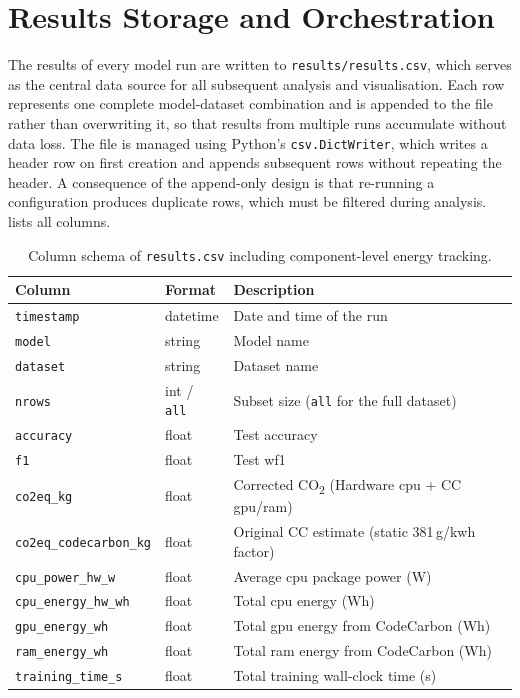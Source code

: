\section{Results Storage and Orchestration}
\label{implementation_results}

The results of every model run are written to \texttt{results/results.csv}, which serves as the central data source for all subsequent analysis and visualisation. Each row represents one complete model-dataset combination and is appended to the file rather than overwriting it, so that results from multiple runs accumulate without data loss. The file is managed using Python's \texttt{csv.DictWriter}, which writes a header row on first creation and appends subsequent rows without repeating the header. A consequence of the append-only design is that re-running a configuration produces duplicate rows, which must be filtered during analysis.  lists all columns.

\begin{table}[htbp]
\centering
\small
\caption[Column schema of \texttt{results.csv}.]{Column schema of \texttt{results.csv} including component-level energy tracking.}
\label{tab:results_schema}
\begin{tabular}{lll}
\toprule
\textbf{Column} & \textbf{Format} & \textbf{Description} \\
\midrule
\texttt{timestamp}             & datetime & Date and time of the run \\
\texttt{model}                 & string   & Model name \\
\texttt{dataset}               & string   & Dataset name \\
\texttt{nrows}                 & int / \texttt{all} & Subset size (\texttt{all} for the full dataset) \\
\texttt{accuracy}              & float    & Test accuracy \\
\texttt{f1}                    & float    & Test \gls{wf1} \\
\texttt{co2eq\_kg}             & float    & Corrected CO\textsubscript{2} (Hardware \gls{cpu} + CC \gls{gpu}/\gls{ram}) \\
\texttt{co2eq\_codecarbon\_kg} & float    & Original CC estimate (static 381\,g/\gls{kwh} factor) \\
\texttt{cpu\_power\_hw\_w}     & float    & Average \gls{cpu} package power (W) \\
\texttt{cpu\_energy\_hw\_wh}   & float    & Total \gls{cpu} energy (Wh) \\
\texttt{gpu\_energy\_wh}       & float    & Total \gls{gpu} energy from CodeCarbon (Wh) \\
\texttt{ram\_energy\_wh}       & float    & Total \gls{ram} energy from CodeCarbon (Wh) \\
\texttt{training\_time\_s}     & float    & Total training wall-clock time (s) \\
\bottomrule
\end{tabular}
\end{table}


